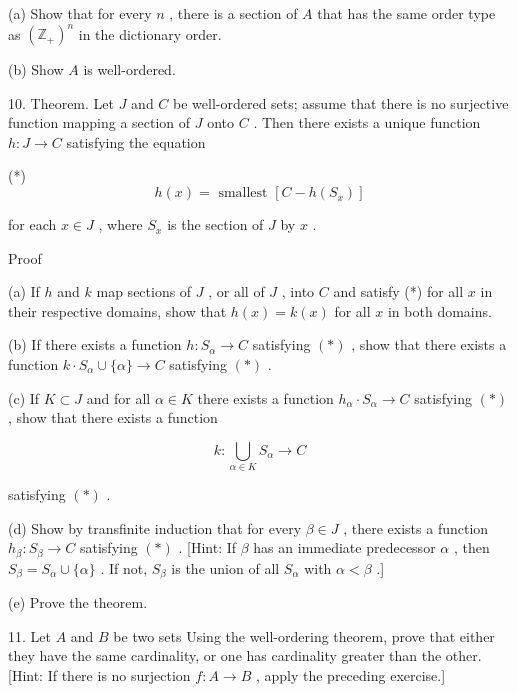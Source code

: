 (a) Show that for every \(n\) , there is a section of \(A\) that has the same order type as \({\left( {\mathbb{Z}}_{ + }\right) }^{n}\) in the dictionary order.

(b) Show \(A\) is well-ordered.

10. Theorem. Let \(J\) and \(C\) be well-ordered sets; assume that there is no surjective function mapping a section of \(J\) onto \(C\) . Then there exists a unique function \(h : J \rightarrow  C\) satisfying the equation

(*)
\[
h\left( x\right)  = \text{ smallest }\left\lbrack  {C - h\left( {S}_{x}\right) }\right\rbrack
\]

for each \(x \in  J\) , where \({S}_{x}\) is the section of \(J\) by \(x\) .

Proof

(a) If \(h\) and \(k\) map sections of \(J\) , or all of \(J\) , into \(C\) and satisfy (*) for all \(x\) in their respective domains, show that \(h\left( x\right)  = k\left( x\right)\) for all \(x\) in both domains.

(b) If there exists a function \(h : {S}_{\alpha } \rightarrow  C\) satisfying \(\left( *\right)\) , show that there exists a function \(k \cdot  {S}_{\alpha } \cup  \{ \alpha \}  \rightarrow  C\) satisfying \(\left( *\right)\) .

(c) If \(K \subset  J\) and for all \(\alpha  \in  K\) there exists a function \({h}_{\alpha } \cdot  {S}_{\alpha } \rightarrow  C\) satisfying \(\left( *\right)\) , show that there exists a function

\[
k : \mathop{\bigcup }\limits_{{\alpha  \in  K}}{S}_{\alpha } \rightarrow  C
\]

satisfying \(\left( *\right)\) .

(d) Show by transfinite induction that for every \(\beta  \in  J\) , there exists a function \({h}_{\beta } : {S}_{\beta } \rightarrow  C\) satisfying \(\left( *\right)\) . [Hint: If \(\beta\) has an immediate predecessor \(\alpha\) , then \({S}_{\beta } = {S}_{\alpha } \cup  \{ \alpha \}\) . If not, \({S}_{\beta }\) is the union of all \({S}_{\alpha }\) with \(\alpha  < \beta\) .]

(e) Prove the theorem.

11. Let \(A\) and \(B\) be two sets Using the well-ordering theorem, prove that either they have the same cardinality, or one has cardinality greater than the other. [Hint: If there is no surjection \(f : A \rightarrow  B\) , apply the preceding exercise.]

